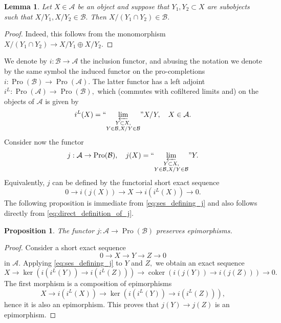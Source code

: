 \documentclass[11pt,leqno]{amsart}
\newtheorem{lemma}[theo]{Lemma}
\newtheorem{prop}[theo]{Proposition}
\numberwithin{equation}{section}
\newcommand{\prolim}[1][]{\mathop{\varprojlim}\limits_{#1}}
\newcommand{\proolim}[1][]{{``{\prolim[#1]}"}}
\newcommand{\cA}{{\mathcal A}}
\newcommand{\cB}{{\mathcal B}}
\newcommand{\coker}{\operatorname{coker}}
\newcommand{\Pro}{\operatorname{Pro}}
\begin{document}
\begin{lemma}\label{lem:intersections}
Let $X\in \cA$ be an object and suppose that $Y_1,Y_2\subset X$ are subobjects such that $X/Y_1, X/Y_2\in \cB.$ Then $X/(Y_1\cap Y_2)\in\cB.$
\end{lemma}

\begin{proof}
Indeed, this follows from the monomorphism $X/(Y_1\cap Y_2)\to X/Y_1\oplus X/Y_2.$
\end{proof}

We denote by $i:\cB\to\cA$ the inclusion functor, and abusing the notation we denote by the same symbol the induced functor on the pro-completions $i:\Pro(\cB)\to\Pro(\cA)$.
The latter functor has a left adjoint $i^L:\Pro(\cA)\to\Pro(\cB),$ which (commutes with cofiltered limits and) on the objects of $\cA$ is given by
\begin{equation*}
i^L(X) = \proolim[\substack{Y\subset X,\\ Y\in\cB, X/Y\in\cB}] X/Y,\quad X\in\cA.
\end{equation*}
Consider now the functor
\begin{equation}\label{eq:direct_definition_of_j}
j:\cA\to\Pro(\cB),\quad j(X) = \proolim[\substack{Y\subset X,\\ Y\in\cB, X/Y\in\cB}] Y.
\end{equation}
Equivalently, $j$ can be defined by the functorial short exact sequence
\begin{equation}\label{eq:ses_defining_j}
0\to i(j(X))\to X\to i(i^L(X))\to 0.
\end{equation}
The following proposition is immediate from \eqref{eq:ses_defining_j} and also follows directly from \eqref{eq:direct_definition_of_j}. 

\begin{prop}\label{prop:j_preserves_epi}
The functor $j:\cA\to\Pro(\cB)$ preserves epimorphisms.
\end{prop} 

\begin{proof}
Consider a short exact sequence
\begin{equation*}
0\to X\to Y\to Z\to 0
\end{equation*}
in $\cA.$ Applying \eqref{eq:ses_defining_j} to $Y$ and $Z,$ we obtain an exact sequence
\begin{equation*}
X\to \ker(i(i^L(Y))\to i(i^L(Z)))\to \coker(i(j(Y))\to i(j(Z)))\to 0.
\end{equation*}
The first morphism is a composition of epimorphisms
\begin{equation*}
X\to i(i^L(X))\to \ker(i(i^L(Y))\to i(i^L(Z))),
\end{equation*} 
hence it is also an epimorphism. This proves that $j(Y)\to j(Z)$ is an epimorphism.
\end{proof}
\end{document}
